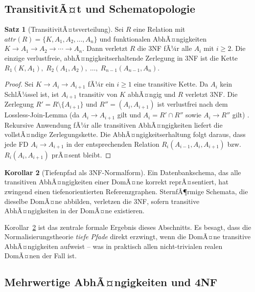 ﻿\documentclass[12pt,a4paper]{article}
\theoremstyle{definition}
\newtheorem{theorem}{Satz}[section]
\newtheorem{corollary}[theorem]{Korollar}
\theoremstyle{remark}
\newcommand{\att}{\mathit{attr}}
\begin{document}
\subsection{TransitivitÃ¤t und Schematopologie}

\begin{theorem}[TransitivitÃ¤tsverteilung]
\label{thm:transitivitaet}
Sei $R$ eine Relation mit $\att(R) = \{K, A_1, A_2, \ldots, A_n\}$ und
funktionalen AbhÃ¤ngigkeiten $K \to A_1 \to A_2 \to \cdots \to A_n$.
Dann verletzt $R$ die 3NF fÃ¼r alle $A_i$ mit $i \geq 2$.
Die einzige verlustfreie, abhÃ¤ngigkeitserhaltende Zerlegung in 3NF ist
die Kette $R_1(K, A_1),\; R_2(A_1, A_2),\; \ldots,\; R_{n-1}(A_{n-1}, A_n)$.
\end{theorem}

\begin{proof}
Sei $K \to A_i \to A_{i+1}$ fÃ¼r ein $i \geq 1$ eine transitive Kette.
Da $A_i$ kein SchlÃ¼ssel ist, ist $A_{i+1}$ transitiv von $K$ abhÃ¤ngig und
$R$ verletzt 3NF. Die Zerlegung $R' = R \setminus \{A_{i+1}\}$ und
$R'' = (A_i, A_{i+1})$ ist verlustfrei nach dem Lossless-Join-Lemma
(da $A_i \to A_{i+1}$ gilt und $A_i = R' \cap R''$ sowie $A_i \to R''$ gilt)
\cite{Ullman1988}. Rekursive Anwendung fÃ¼r alle transitiven AbhÃ¤ngigkeiten
liefert die vollstÃ¤ndige Zerlegungskette. Die AbhÃ¤ngigkeitserhaltung folgt
daraus, dass jede FD $A_i \to A_{i+1}$ in der entsprechenden Relation
$R_i(A_{i-1}, A_i, A_{i+1})$ bzw.\ $R_i(A_i, A_{i+1})$ prÃ¤sent bleibt.
\end{proof}

\begin{corollary}[Tiefenpfad als 3NF-Normalform]
\label{cor:tiefenpfad3NF}
Ein Datenbankschema, das alle transitiven AbhÃ¤ngigkeiten einer DomÃ¤ne
korrekt reprÃ¤sentiert, hat zwingend einen tiefenorientierten Referenzgraphen.
SternfÃ¶rmige Schemata, die dieselbe DomÃ¤ne abbilden, verletzen die 3NF,
sofern transitive AbhÃ¤ngigkeiten in der DomÃ¤ne existieren.
\end{corollary}

Korollar~\ref{cor:tiefenpfad3NF} ist das zentrale formale Ergebnis dieses
Abschnitts. Es besagt, dass die Normalisierungstheorie \emph{tiefe Pfade}
direkt erzwingt, wenn die DomÃ¤ne transitive AbhÃ¤ngigkeiten aufweist --
was in praktisch allen nicht-trivialen realen DomÃ¤nen der Fall ist.

\subsection{Mehrwertige AbhÃ¤ngigkeiten und 4NF}
\end{document}
